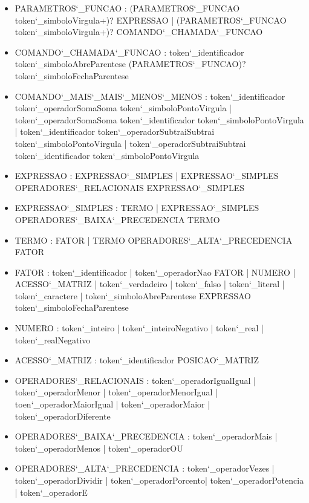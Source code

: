 \documentclass[
12pt,				%
a4paper,			%
english,			%
french,				%
spanish,			%
brazil,				%
article
]{abntex2}
\begin{document}
\begin{itemize}
	\item PARAMETROS\char`_FUNCAO : (PARAMETROS\char`_FUNCAO token\char`_simboloVirgula+)? EXPRESSAO | (PARAMETROS\char`_FUNCAO token\char`_simboloVirgula+)? COMANDO\char`_CHAMADA\char`_FUNCAO
	\item COMANDO\char`_CHAMADA\char`_FUNCAO : token\char`_identificador token\char`_simboloAbreParentese (PARAMETROS\char`_FUNCAO)? token\char`_simboloFechaParentese
	\item COMANDO\char`_MAIS\char`_MAIS\char`_MENOS\char`_MENOS : token\char`_identificador token\char`_operadorSomaSoma token\char`_simboloPontoVirgula |  token\char`_operadorSomaSoma token\char`_identificador token\char`_simboloPontoVirgula | token\char`_identificador token\char`_operadorSubtraiSubtrai token\char`_simboloPontoVirgula | token\char`_operadorSubtraiSubtrai token\char`_identificador token\char`_simboloPontoVirgula
	\item EXPRESSAO : EXPRESSAO\char`_SIMPLES | EXPRESSAO\char`_SIMPLES OPERADORES\char`_RELACIONAIS EXPRESSAO\char`_SIMPLES
	\item EXPRESSAO\char`_SIMPLES : TERMO | EXPRESSAO\char`_SIMPLES OPERADORES\char`_BAIXA\char`_PRECEDENCIA TERMO
	\item TERMO : FATOR | TERMO OPERADORES\char`_ALTA\char`_PRECEDENCIA FATOR
	\item FATOR : token\char`_identificador | token\char`_operadorNao FATOR | NUMERO | ACESSO\char`_MATRIZ | token\char`_verdadeiro | token\char`_falso | token\char`_literal | token\char`_caractere | token\char`_simboloAbreParentese EXPRESSAO token\char`_simboloFechaParentese
	\item NUMERO : token\char`_inteiro | token\char`_inteiroNegativo | token\char`_real | token\char`_realNegativo
	\item ACESSO\char`_MATRIZ : token\char`_identificador POSICAO\char`_MATRIZ
	\item OPERADORES\char`_RELACIONAIS : token\char`_operadorIgualIgual | token\char`_operadorMenor | token\char`_operadorMenorIgual | toen\char`_operadorMaiorIgual | token\char`_operadorMaior | token\char`_operadorDiferente
	\item OPERADORES\char`_BAIXA\char`_PRECEDENCIA : token\char`_operadorMais | token\char`_operadorMenos | token\char`_operadorOU
	\item OPERADORES\char`_ALTA\char`_PRECEDENCIA : token\char`_operadorVezes | token\char`_operadorDividir | token\char`_operadorPorcento| token\char`_operadorPotencia | token\char`_operadorE
\end{itemize}
\end{document}
